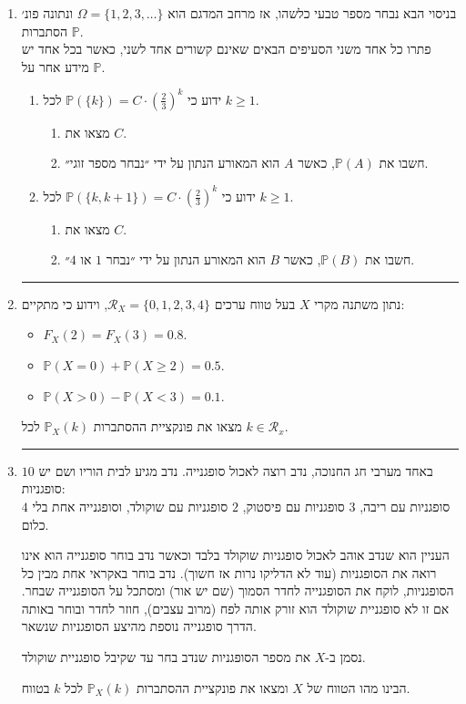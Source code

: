 \documentclass[12pt, a4paper]{article}
\newcommand{\cR}{\mathcal{R}}
\newcommand{\PP}{\mathbb{P}}
\begin{document}
\begin{enumerate}
\begin{enumerate}
\end{enumerate}

\noindent\rule{15cm}{0.4pt}

\newpage

\item
בניסוי הבא נבחר מספר טבעי כלשהו, אז
מרחב המדגם הוא
$\Omega=\{1,2,3,\ldots\}$
ונתונה פונ׳ הסתברות
$\PP$.
\\
פתרו כל אחד משני הסעיפים הבאים שאינם קשורים אחד לשני, כאשר בכל אחד יש מידע אחר על
$\PP$.
\begin{enumerate}
\item
ידוע כי
$\PP(\{k\})=C\cdot
\left(
\frac{2}{3}\right)^k$
לכל
$k\ge1$.
\begin{enumerate}
\item[(1)]
מצאו את
$C$.
\item[(2)]
חשבו את 
$\PP(A)$,
כאשר
$A$
הוא המאורע הנתון על ידי ״נבחר מספר זוגי״.\\
\end{enumerate}
\item
ידוע כי
$\PP(\{k,k+1\})=C\cdot \left(\frac{2}{3}\right)^k$
לכל
$k\ge1$.
\begin{enumerate}
\item[(1)]
מצאו את
$C$.
\item[(2)]
חשבו את
$\PP(B)$,
כאשר
$B$
הוא המאורע הנתון על ידי
״נבחר 
$1$
או
$4$״.
\end{enumerate}
\end{enumerate}

\noindent\rule{15cm}{0.4pt}

\item
נתון משתנה מקרי
$X$
בעל טווח ערכים
$\cR_X=\{0,1,2,3,4\}$,
וידוע כי מתקיים:
\begin{itemize}
\item
$F_X(2)=F_X(3)=0.8$.
\item
$\PP(X=0)+\PP(X\ge 2)=0.5$.
\item
$\PP(X>0)-\PP(X<3)=0.1$.
\end{itemize}
מצאו את פונקציית ההסתברות 
$\PP_X(k)$
לכל
$k\in \cR_x$.

\noindent\rule{15cm}{0.4pt}

\item
באחד מערבי חג החנוכה, נדב רוצה לאכול סופגנייה. נדב מגיע לבית הוריו ושם יש 
$10$
סופגניות:
\\
$4$
סופגניות עם ריבה,
$3$
סופגניות עם פיסטוק,
$2$
סופגניות עם שוקולד,
וסופגנייה אחת בלי כלום.

העניין הוא שנדב אוהב לאכול סופגניות שוקולד בלבד
וכאשר נדב בוחר סופגנייה הוא אינו רואה את הסופגניות (עוד לא הדליקו נרות אז חשוך). 
נדב בוחר באקראי אחת מבין כל הסופגניות, לוקח את הסופגנייה לחדר הסמוך (שם יש אור) ומסתכל על הסופגנייה שבחר. אם זו לא סופגניית שוקולד הוא זורק אותה לפח (מרוב עצבים), חוזר לחדר ובוחר באותה הדרך סופגנייה נוספת מהיצע הסופגניות שנשאר.

נסמן ב-$X$
את מספר הסופגניות שנדב בחר עד שקיבל סופגניית שוקולד.

הבינו מהו הטווח של
$X$
ומצאו את פונקציית  ההסתברות
$\PP_X(k)$
לכל
$k$
בטווח.
\end{enumerate}
\end{document}
